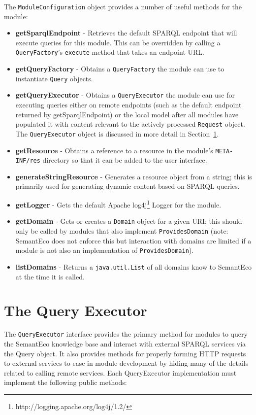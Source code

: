 \documentclass[letterpaper]{report}
\begin{document}
The \texttt{ModuleConfiguration} object provides a number of useful methods for the module:

\begin{itemize}
\item\textbf{getSparqlEndpoint} - Retrieves the default SPARQL endpoint that will execute queries for this module. This can be overridden by calling a \texttt{QueryFactory}'s \texttt{execute} method that takes an endpoint URL.
\item\textbf{getQueryFactory} - Obtains a \texttt{QueryFactory} the module can use to instantiate \texttt{Query} objects.
\item\textbf{getQueryExecutor} - Obtains a \texttt{QueryExecutor} the module can use for executing queries either on remote endpoints (such as the default endpoint returned by getSparqlEndpoint) or the local model after all modules have populated it with content relevant to the actively processed \texttt{Request} object. The \texttt{QueryExecutor} object is discussed in more detail in Section~\ref{query-executor}.
\item\textbf{getResource} - Obtains a reference to a resource in the module's \texttt{META-INF/res} directory so that it can be added to the user interface.
\item\textbf{generateStringResource} - Generates a resource object from a string; this is primarily used for generating dynamic content based on SPARQL queries.
\item\textbf{getLogger} - Gets the default Apache log4j\footnote{http://logging.apache.org/log4j/1.2/} Logger for the module.
\item\textbf{getDomain} - Gets or creates a \texttt{Domain} object for a given URI; this should only be called by modules that also implement \texttt{ProvidesDomain} (note: SemantEco does not enforce this but interaction with domains are limited if a module is not also an implementation of \texttt{ProvidesDomain}).
\item\textbf{listDomains} - Returns a \texttt{java.util.List} of all domains know to SemantEco at the time it is called.
\end{itemize}

\section{The Query Executor}
\label{query-executor}
The \texttt{QueryExecutor} interface provides the primary method for modules to query the SemantEco knowledge base and interact with external SPARQL services via the Query object. It also provides methods for properly forming HTTP requests to external services to ease in module development by hiding many of the details related to calling remote services. Each QueryExecutor implementation must implement the following public methods:
\end{document}
